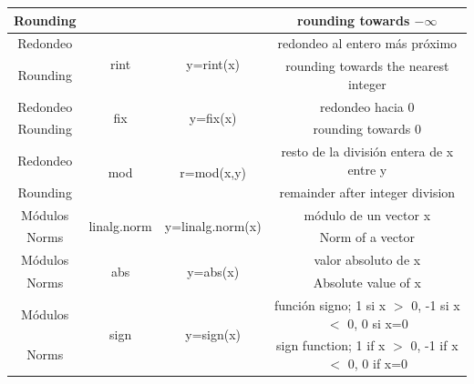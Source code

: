 \begin{table}[H]
\begin{tabular}{c|c|c|c}
Rounding& & & rounding towards $-\infty$ \\
\hline
Redondeo&\multirow{2}{*}{rint}&\multirow{2}{*}{y=rint(x)}&redondeo al entero más próximo\\
Rounding& & & rounding towards the nearest integer\\
\hline
Redondeo&\multirow{2}{*}{fix}&\multirow{2}{*}{y=fix(x)}&redondeo hacia $0$\\
Rounding& & & rounding towards $0$\\
\hline
Redondeo&\multirow{2}{*}{mod}&\multirow{2}{*}{r=mod(x,y)}&resto de la división entera de x entre y\\
Rounding& & & remainder after integer division\\
\hline
\hline
Módulos&\multirow{2}{*}{linalg.norm}&\multirow{2}{*}{y=linalg.norm(x)}& módulo de un vector x\\
Norms & & & Norm of a vector\\
\hline
Módulos&\multirow{2}{*}{abs}&\multirow{2}{*}{y=abs(x)}&valor absoluto de x\\
Norms & & & Absolute value of x\\
\hline
Módulos&\multirow{2}{*}{sign}&\multirow{2}{*}{y=sign(x)}&función signo; 1 si x $>$ 0, -1 si x $<$ 0, 0 si x=0\\
Norms & & &sign function; 1 if x $>$ 0, -1 if x $<$ 0, 0 if x=0\\ 
\end{tabular}
\end{table}

